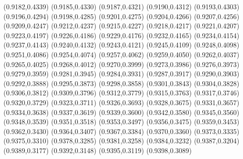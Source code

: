 \PST@Filltriangle(0.9182,0.4339)
\PST@Filltriangle(0.9185,0.4330)
\PST@Filltriangle(0.9187,0.4321)
\PST@Filltriangle(0.9190,0.4312)
\PST@Filltriangle(0.9193,0.4303)
\PST@Filltriangle(0.9196,0.4294)
\PST@Filltriangle(0.9198,0.4285)
\PST@Filltriangle(0.9201,0.4275)
\PST@Filltriangle(0.9204,0.4266)
\PST@Filltriangle(0.9207,0.4256)
\PST@Filltriangle(0.9209,0.4247)
\PST@Filltriangle(0.9212,0.4237)
\PST@Filltriangle(0.9215,0.4227)
\PST@Filltriangle(0.9218,0.4217)
\PST@Filltriangle(0.9221,0.4207)
\PST@Filltriangle(0.9223,0.4197)
\PST@Filltriangle(0.9226,0.4186)
\PST@Filltriangle(0.9229,0.4176)
\PST@Filltriangle(0.9232,0.4165)
\PST@Filltriangle(0.9234,0.4154)
\PST@Filltriangle(0.9237,0.4143)
\PST@Filltriangle(0.9240,0.4132)
\PST@Filltriangle(0.9243,0.4121)
\PST@Filltriangle(0.9245,0.4109)
\PST@Filltriangle(0.9248,0.4098)
\PST@Filltriangle(0.9251,0.4086)
\PST@Filltriangle(0.9254,0.4074)
\PST@Filltriangle(0.9257,0.4062)
\PST@Filltriangle(0.9259,0.4050)
\PST@Filltriangle(0.9262,0.4037)
\PST@Filltriangle(0.9265,0.4025)
\PST@Filltriangle(0.9268,0.4012)
\PST@Filltriangle(0.9270,0.3999)
\PST@Filltriangle(0.9273,0.3986)
\PST@Filltriangle(0.9276,0.3973)
\PST@Filltriangle(0.9279,0.3959)
\PST@Filltriangle(0.9281,0.3945)
\PST@Filltriangle(0.9284,0.3931)
\PST@Filltriangle(0.9287,0.3917)
\PST@Filltriangle(0.9290,0.3903)
\PST@Filltriangle(0.9292,0.3888)
\PST@Filltriangle(0.9295,0.3873)
\PST@Filltriangle(0.9298,0.3858)
\PST@Filltriangle(0.9301,0.3843)
\PST@Filltriangle(0.9304,0.3828)
\PST@Filltriangle(0.9306,0.3812)
\PST@Filltriangle(0.9309,0.3796)
\PST@Filltriangle(0.9312,0.3779)
\PST@Filltriangle(0.9315,0.3763)
\PST@Filltriangle(0.9317,0.3746)
\PST@Filltriangle(0.9320,0.3729)
\PST@Filltriangle(0.9323,0.3711)
\PST@Filltriangle(0.9326,0.3693)
\PST@Filltriangle(0.9328,0.3675)
\PST@Filltriangle(0.9331,0.3657)
\PST@Filltriangle(0.9334,0.3638)
\PST@Filltriangle(0.9337,0.3619)
\PST@Filltriangle(0.9339,0.3600)
\PST@Filltriangle(0.9342,0.3580)
\PST@Filltriangle(0.9345,0.3560)
\PST@Filltriangle(0.9348,0.3539)
\PST@Filltriangle(0.9351,0.3518)
\PST@Filltriangle(0.9353,0.3497)
\PST@Filltriangle(0.9356,0.3475)
\PST@Filltriangle(0.9359,0.3453)
\PST@Filltriangle(0.9362,0.3430)
\PST@Filltriangle(0.9364,0.3407)
\PST@Filltriangle(0.9367,0.3384)
\PST@Filltriangle(0.9370,0.3360)
\PST@Filltriangle(0.9373,0.3335)
\PST@Filltriangle(0.9375,0.3310)
\PST@Filltriangle(0.9378,0.3285)
\PST@Filltriangle(0.9381,0.3258)
\PST@Filltriangle(0.9384,0.3232)
\PST@Filltriangle(0.9387,0.3204)
\PST@Filltriangle(0.9389,0.3177)
\PST@Filltriangle(0.9392,0.3148)
\PST@Filltriangle(0.9395,0.3119)
\PST@Filltriangle(0.9398,0.3089)

